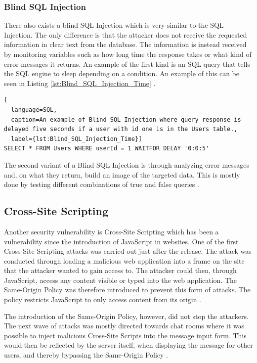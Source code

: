 \subsubsection{Blind SQL Injection}
There also exists a blind SQL Injection which is very similar to the SQL Injection. The only difference is that the attacker does not receive the requested information in clear text from the database. The information is instead received by monitoring variables such as how long time the response takes or what kind of error messages it returns. An example of the first kind is an SQL query that tells the SQL engine to sleep depending on a condition. An example of this can be seen in Listing \ref{lst:Blind_SQL_Injection_Time} \parencite{JustinClarke-Salt2009SIAa, Secure_Web}.

\hfill
\begin{lstlisting}[
  language=SQL,
  caption=An example of Blind SQL Injection where query response is delayed five seconds if a user with id one is in the Users table.,
  label={lst:Blind_SQL_Injection_Time}]
SELECT * FROM Users WHERE userId = 1 WAITFOR DELAY '0:0:5'
\end{lstlisting}
\hfill

The second variant of a Blind SQL Injection is through analyzing error messages and, on what they return, build an image of the targeted data. This is mostly done by testing different combinations of true and false queries \parencite{JustinClarke-Salt2009SIAa, Secure_Web}.



\subsection{Cross-Site Scripting}
Another security vulnerability is Cross-Site Scripting which has been a vulnerability since the introduction of JavaScript in websites. One of the first Cross-Site Scripting attacks was carried out just after the release. The attack was conducted through loading a malicious web application into a frame on the site that the attacker wanted to gain access to. The attacker could then, through JavaScript, access any content visible or typed into the web application. The  Same-Origin Policy was therefore introduced to prevent this form of attacks. The policy restricts JavaScript to only access content from its origin \parencite{FogieSeth2007Xacs, w3csop}.

The introduction of the Same-Origin Policy, however, did not stop the attackers. The next wave of attacks was mostly directed towards chat rooms where it was possible to inject malicious Cross-Site Scripts into the message input form. This would then be reflected by the server itself, when displaying the message for other users, and thereby bypassing the Same-Origin Policy \parencite{FogieSeth2007Xacs}.

